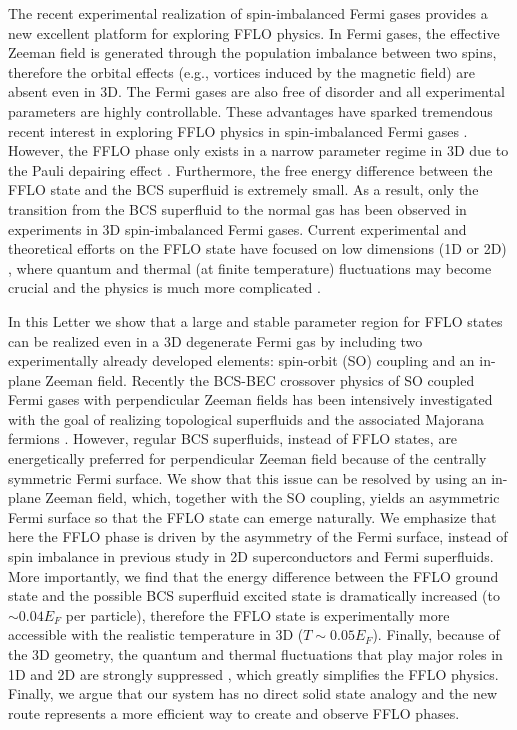 \documentclass[prl,showpacs,twocolumn]{revtex4}
\begin{document}
The recent experimental realization of spin-imbalanced Fermi gases \cite%
{Zwierlein05,Zwierlein06,Hulet1,Hulet2,Shin} provides a new excellent
platform for exploring FFLO physics. In Fermi gases, the effective Zeeman
field is generated through the population imbalance between two spins,
therefore the orbital effects (e.g., vortices induced by the magnetic field)
are absent even in 3D. The Fermi gases are also free of disorder and all
experimental parameters are highly controllable. These advantages have
sparked tremendous recent interest in exploring FFLO physics in
spin-imbalanced Fermi gases \cite{Hu, He06,
Parish,Melo,Bulgas,Sheehy,Koponen,Liu, Yasuharu, Devreese1, Devreese2}.
However, the FFLO phase only exists in a narrow parameter regime in 3D due
to the Pauli depairing effect \cite{Hu,Bulgas,Sheehy}. Furthermore, the free
energy difference between the FFLO state and the BCS superfluid is extremely
small. As a result, only the transition from the BCS superfluid to the
normal gas \cite{Zwierlein05,Zwierlein06,Hulet1} has been observed in
experiments in 3D spin-imbalanced Fermi gases. Current experimental and
theoretical efforts on the FFLO state have focused on low dimensions (1D or
2D) \cite{Hulet3,Orso,Hu2,Parish2,Pu}, where quantum and thermal (at finite
temperature) fluctuations may become crucial and the physics is much more
complicated \cite{BKT1,BKT2,BKT3}.

In this Letter we show that a large and stable parameter region for FFLO
states can be realized even in a 3D degenerate Fermi gas by including two
experimentally already developed \cite{Spielman,Jing,Zwierlein12} elements:
spin-orbit (SO) coupling and an in-plane Zeeman field. Recently the BCS-BEC
crossover physics of SO coupled Fermi gases with perpendicular Zeeman fields
has been intensively investigated with the goal of realizing topological
superfluids \cite{CWZhang,Gong11,JZhou,Iskin} and the associated Majorana
fermions \cite{Gong12,LiuXJ,Iskin2}. However, regular BCS superfluids,
instead of FFLO states, are energetically preferred for perpendicular Zeeman
field because of the centrally symmetric Fermi surface. We show that this
issue can be resolved by using an in-plane Zeeman field, which, together
with the SO coupling, yields an asymmetric Fermi surface so that the FFLO
state can emerge naturally. We emphasize that here the FFLO phase is driven
by the asymmetry of the Fermi surface, instead of spin imbalance in previous
study in 2D superconductors and Fermi superfluids. More importantly, we find
that the energy difference between the FFLO ground state and the possible
BCS superfluid excited state is dramatically increased (to $\sim 0.04E_{F}$
per particle), therefore the FFLO state is experimentally more accessible
with the realistic temperature in 3D ($T\sim 0.05E_{F}$). Finally, because
of the 3D geometry, the quantum and thermal fluctuations that play major
roles in 1D and 2D are strongly suppressed \cite{BKT1,BKT2,BKT3}, which
greatly simplifies the FFLO physics. Finally, we argue that our system has
no direct solid state analogy and the new route represents a more efficient
way to create and observe FFLO phases.
\end{document}
